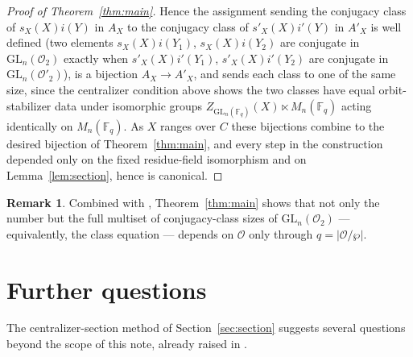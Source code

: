\documentclass[11pt]{amsart}
\theoremstyle{definition}
\newtheorem{remark}[theorem]{Remark}
\newcommand{\GL}{\mathrm{GL}}
\newcommand{\Fq}{\mathbb{F}_q}
\begin{document}
\begin{proof}[Proof of Theorem~\ref{thm:main}]
		Hence the assignment sending the conjugacy class of $s_X(X)i(Y)$ in
		$A_X$ to the conjugacy class of $s'_X(X)i'(Y)$ in $A'_X$ is well defined
		(two elements $s_X(X)i(Y_1)$, $s_X(X)i(Y_2)$ are conjugate in
		$\GL_n(\mathcal O_2)$ exactly when $s'_X(X)i'(Y_1)$, $s'_X(X)i'(Y_2)$ are
		conjugate in $\GL_n(\mathcal O'_2)$), is a bijection $A_X\to A'_X$, and
		sends each class to one of the same size, since the centralizer condition
		above shows the two classes have equal orbit-stabilizer data under
		isomorphic groups $Z_{\GL_n(\Fq)}(X)\ltimes M_n(\Fq)$ acting identically on
		$M_n(\Fq)$. As $X$ ranges over $C$ these bijections combine to the desired
		bijection of Theorem~\ref{thm:main}, and every step in the construction
		depended only on the fixed residue-field isomorphism and on
		Lemma~\ref{lem:section}, hence is canonical.
	\end{proof}
	
	\begin{remark}
		Combined with \cite[Theorem~1.2.1]{Thesis}, Theorem~\ref{thm:main} shows
		that not only the number but the full multiset of conjugacy-class sizes of
		$\GL_n(\mathcal O_2)$ — equivalently, the class equation — depends on
		$\mathcal O$ only through $q=|\mathcal O/\wp|$.
	\end{remark}
	
	\section{Further questions}\label{sec:questions}
	
	The centralizer-section method of Section~\ref{sec:section} suggests
	several questions beyond the scope of this note, already raised in
	\cite[\S 5.2]{Thesis}.
	
\end{document}
